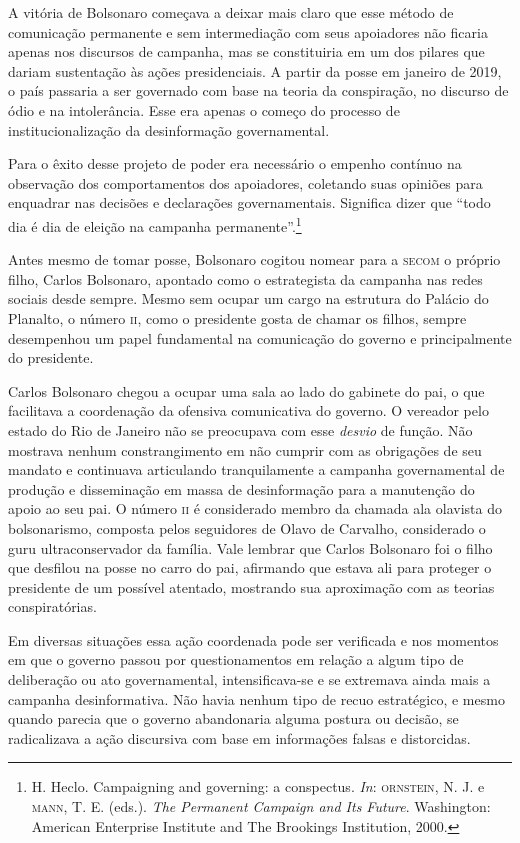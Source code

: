A vitória de Bolsonaro começava a deixar mais claro que esse método de
comunicação permanente e sem intermediação com seus apoiadores não
ficaria apenas nos discursos de campanha, mas se constituiria em um dos
pilares que dariam sustentação às ações presidenciais. A partir da posse
em janeiro de 2019, o país passaria a ser governado com base na teoria da
conspiração, no discurso de ódio e na intolerância. Esse era apenas o
começo do processo de institucionalização da desinformação
governamental.

Para o êxito desse projeto de poder era necessário o empenho contínuo na
observação dos comportamentos dos apoiadores, coletando suas opiniões
para enquadrar nas decisões e declarações governamentais. Significa
dizer que ``todo dia é dia de eleição na campanha permanente''.\footnote{H. Heclo. Campaigning and governing: a conspectus. \textit{In}: \textsc{ornstein}, N. J. e \textsc{mann}, T. E. (eds.). \textit{The Permanent Campaign and Its Future}. Washington:
American Enterprise Institute and The Brookings Institution, 2000.}

Antes mesmo de tomar posse, Bolsonaro cogitou nomear para a \textsc{secom} o próprio filho, 
Carlos Bolsonaro, apontado como
o estrategista da campanha nas redes sociais desde sempre. Mesmo sem ocupar um
cargo na estrutura do Palácio do Planalto, o número \textsc{ii}, como o presidente
gosta de chamar os filhos, sempre desempenhou um papel fundamental na
comunicação do governo e principalmente do presidente.

Carlos Bolsonaro chegou a ocupar uma sala ao lado do gabinete do pai, o
que facilitava a coordenação da ofensiva comunicativa do governo. O
vereador pelo estado do Rio de Janeiro não se preocupava com esse
\textit{desvio} de função. Não mostrava nenhum constrangimento em não cumprir
com as obrigações de seu mandato e continuava articulando tranquilamente
a campanha governamental de produção e disseminação em massa de
desinformação para a manutenção do apoio ao seu pai. O número \textsc{ii} é
considerado membro da chamada ala olavista do bolsonarismo, composta
pelos seguidores de Olavo de Carvalho, considerado o guru
ultraconservador da família. Vale lembrar que Carlos Bolsonaro foi o
filho que desfilou na posse no carro do pai, afirmando que estava ali
para proteger o presidente de um possível atentado, mostrando sua
aproximação com as teorias conspiratórias.

Em diversas situações essa ação coordenada pode ser verificada e nos
momentos em que o governo passou por questionamentos em relação a algum
tipo de deliberação ou ato governamental, intensificava-se e se
extremava ainda mais a campanha desinformativa. Não havia nenhum tipo de
recuo estratégico, e mesmo quando parecia que o governo abandonaria alguma
postura ou decisão, se radicalizava a ação discursiva com base em
informações falsas e distorcidas.

